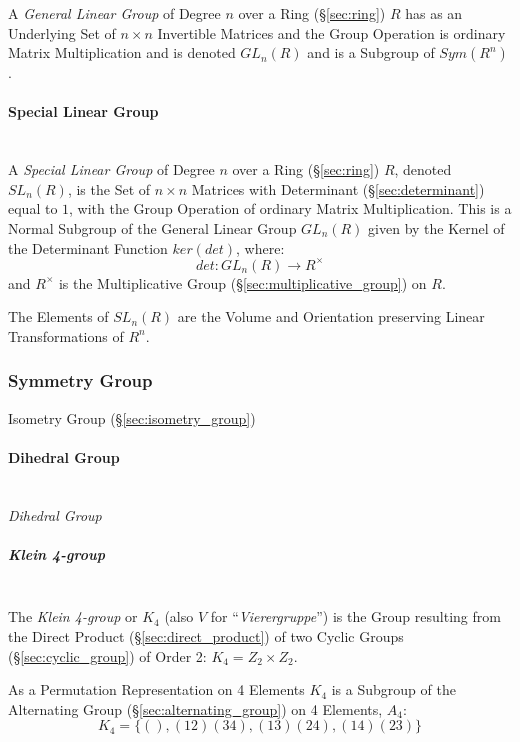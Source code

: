 A \emph{General Linear Group} of Degree $n$ over a Ring
(\S\ref{sec:ring}) $R$ has as an Underlying Set of $n \times n$
Invertible Matrices and the Group Operation is ordinary Matrix
Multiplication and is denoted $GL_n(R)$ and is a Subgroup of
$Sym(R^n)$.



\paragraph{Special Linear Group}\label{sec:special_linear_group}
\hfill \\

A \emph{Special Linear Group} of Degree $n$ over a Ring
(\S\ref{sec:ring}) $R$, denoted $SL_n(R)$, is the Set of $n \times n$
Matrices with Determinant (\S\ref{sec:determinant}) equal to $1$, with
the Group Operation of ordinary Matrix Multiplication. This is a
Normal Subgroup of the General Linear Group $GL_n(R)$ given by the
Kernel of the Determinant Function $ker(det)$, where:
\[
  det : GL_n(R) \rightarrow R^\times
\]
and $R^\times$ is the Multiplicative Group
(\S\ref{sec:multiplicative_group}) on $R$.

The Elements of $SL_n(R)$ are the Volume and Orientation preserving
Linear Transformations of $R^n$.



\subsubsection{Symmetry Group}\label{sec:symmetry_group}

Isometry Group (\S\ref{sec:isometry_group})



\paragraph{Dihedral Group}\label{sec:dihedral_group}
\hfill \\

\emph{Dihedral Group}


\subparagraph{Klein 4-group}\label{sec:klein_4group}
\hfill \\

The \emph{Klein 4-group} or $K_4$ (also $V$ for
``\emph{Vierergruppe}'') is the Group resulting from the Direct
Product (\S\ref{sec:direct_product}) of two Cyclic Groups
(\S\ref{sec:cyclic_group}) of Order 2: $K_4 = Z_2 \times Z_2$.

As a Permutation Representation on 4 Elements $K_4$ is a Subgroup of
the Alternating Group (\S\ref{sec:alternating_group}) on 4 Elements,
$A_4$:
\[
    K_4 = \{ (), (12)(34), (13)(24), (14)(23) \}
\]

